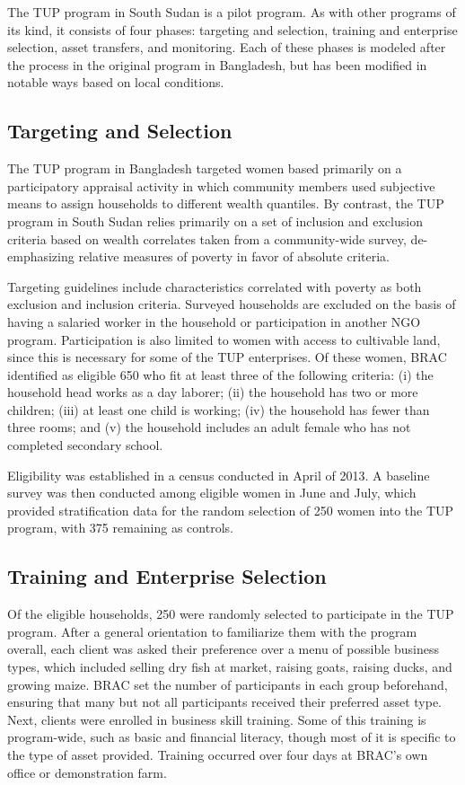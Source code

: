 \documentclass[11pt]{article}
\begin{document}
The TUP program in South Sudan is a pilot program.  As with other
programs of its kind, it consists of four phases: targeting and
selection, training and enterprise selection, asset transfers, and
monitoring.  Each of these phases is modeled after the process in the
original program in Bangladesh, but has been modified in notable ways
based on local conditions.

\subsection*{Targeting and Selection}
\label{sec-2-1}

The TUP program in Bangladesh targeted women based primarily on a
participatory appraisal activity in which community members used
subjective means to assign households to different wealth quantiles.
By contrast, the TUP program in South Sudan relies primarily on a set
of inclusion and exclusion criteria based on wealth correlates taken
from a community-wide survey, de-emphasizing relative measures of
poverty in favor of absolute criteria.               

Targeting guidelines include characteristics correlated with poverty
as both exclusion and inclusion criteria. Surveyed households are
excluded on the basis of having a salaried worker in the household or
participation in another NGO program. Participation is also limited to
women with access to cultivable land, since this is necessary for some
of the TUP enterprises.  Of these women, BRAC identified as eligible
650 who fit at least three of the following criteria: (i) the household
head works as a day laborer; (ii) the household has two or more
children; (iii) at least one child is working; (iv) the household has fewer
than three rooms; and (v) the household includes an adult female
who has not completed secondary school.

Eligibility was established in a census conducted in April of 2013. A baseline
survey was then conducted among eligible women in June and July, which provided
stratification data for the random selection of 250 women into the TUP program,
with 375 remaining as controls.

\subsection*{Training and Enterprise Selection}
\label{sec-2-2}

Of the eligible households, 250 were randomly selected to participate
in the TUP program. After a general orientation to familiarize them
with the program overall, each client was asked their preference over
a menu of possible business types, which included selling dry fish at
market, raising goats, raising ducks, and growing maize. BRAC set the
number of participants in each group beforehand, ensuring that many
but not all participants received their preferred asset type.  Next,
clients were enrolled in business skill training. Some of this
training is program-wide, such as basic and financial literacy,
though most of it is specific to the type of asset provided.  Training
occurred over four days at BRAC's own office or demonstration farm.
\end{document}
